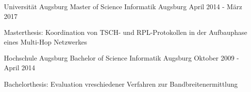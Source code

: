 


\begin{cventries}


\cventry
{Universität Augsburg} %
{Master of Science Informatik} %
{Augsburg} %
{April 2014 - März 2017} %
{ %
\begin{cvitems}
\item {Masterthesis: Koordination von TSCH- und RPL-Protokollen in der Aufbauphase eines Multi-Hop Netzwerkes}
\end{cvitems}
}

\cventry
{Hochschule Augsburg}
{Bachelor of Science Informatik}
{Augsburg}
{Oktober 2009 - April 2014}
{
\begin{cvitems}
\item {Bachelorthesis: Evaluation vreschiedener Verfahren zur Bandbreitenermittlung}
\end{cvitems}
}


\end{cventries}
